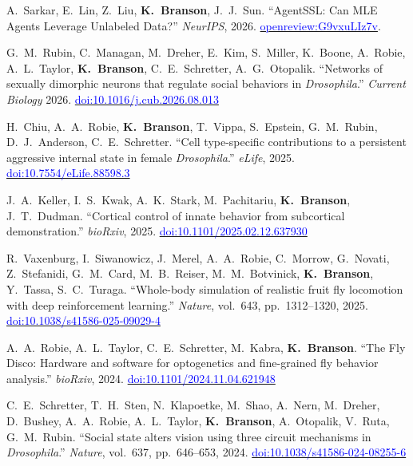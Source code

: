 \begin{cvenum}
\item A.~Sarkar, E.~Lin, Z.~Liu, {\bf K.~Branson}, J.~J.~Sun. ``AgentSSL: Can MLE Agents Leverage Unlabeled Data?'' {\em Neur{IPS}}, 2026. \href{https://openreview.net/forum?id=G9vxuLIz7v}{\small\textcolor{blue}{openreview:G9vxuLIz7v}}.

\item G.~M.~Rubin, C.~Managan, M.~Dreher, E.~Kim, S.~Miller, K.~Boone, A.~Robie, A.~L.~Taylor, {\bf K.~Branson}, C.~E.~Schretter, A.~G.~Otopalik. ``Networks of sexually dimorphic neurons that regulate social behaviors in {\em {D}rosophila}.'' {\em Current Biology} 2026. \href{https://doi.org/10.1016/j.cub.2026.08.013}{\small\textcolor{blue}{doi:10.1016/j.cub.2026.08.013}}

\item H.~Chiu, A.~A.~Robie, {\bf K.~Branson}, T.~Vippa, S.~Epstein, G.~M.~Rubin, D.~J.~Anderson, C.~E.~Schretter. ``Cell type-specific contributions to a persistent aggressive internal state in female {\em {D}rosophila}.'' {\em eLife}, 2025. \href{https://doi.org/10.7554/eLife.88598.3}{\small\textcolor{blue}{doi:10.7554/eLife.88598.3}}

\item  J.~A.~Keller, I.~S.~Kwak, A.~K.~Stark, M.~Pachitariu, {\bf K.~Branson}, J.~T.~Dudman. ``Cortical control of innate behavior from subcortical demonstration.'' {\em bioRxiv}, 2025. \href{https://doi.org/10.1101/2025.02.12.637930}{\small\textcolor{blue}{doi:10.1101/2025.02.12.637930}}

\item R.~Vaxenburg, I.~Siwanowicz, J.~Merel, A.~A.~Robie, C.~Morrow, G.~Novati, Z.~Stefanidi, G.~M.~Card, M.~B.~Reiser, M.~M.~Botvinick, {\bf K.~Branson}, Y.~Tassa, S.~C.~Turaga. ``Whole-body simulation of realistic fruit fly locomotion with deep reinforcement learning.'' {\em Nature}, vol.~643, pp.~1312--1320, 2025. \href{https://doi.org/10.1038/s41586-025-09029-4}{\small\textcolor{blue}{doi:10.1038/s41586-025-09029-4}}

\item A.~A.~Robie, A.~L.~Taylor, C.~E.~Schretter, M.~Kabra, {\bf K.~Branson}. ``The {F}ly {D}isco: {H}ardware and software for optogenetics and fine-grained fly behavior analysis.'' {\em bioRxiv}, 2024. \href{https://doi.org/10.1101/2024.11.04.621948}{\small\textcolor{blue}{doi:10.1101/2024.11.04.621948}}

\item C.~E.~Schretter, T.~H.~Sten, N.~Klapoetke, M.~Shao, A.~Nern, M.~Dreher, D.~Bushey, A.~A.~Robie, A.~L.~Taylor, {\bf K.~Branson}, A.~Otopalik, V.~Ruta, G.~M.~Rubin. ``Social state alters vision using three circuit mechanisms in {\em {D}rosophila}.'' {\em Nature}, vol.~637, pp.~646--653, 2024. \href{https://doi.org/10.1038/s41586-024-08255-6}{\small\textcolor{blue}{doi:10.1038/s41586-024-08255-6}}


\end{cvenum}
